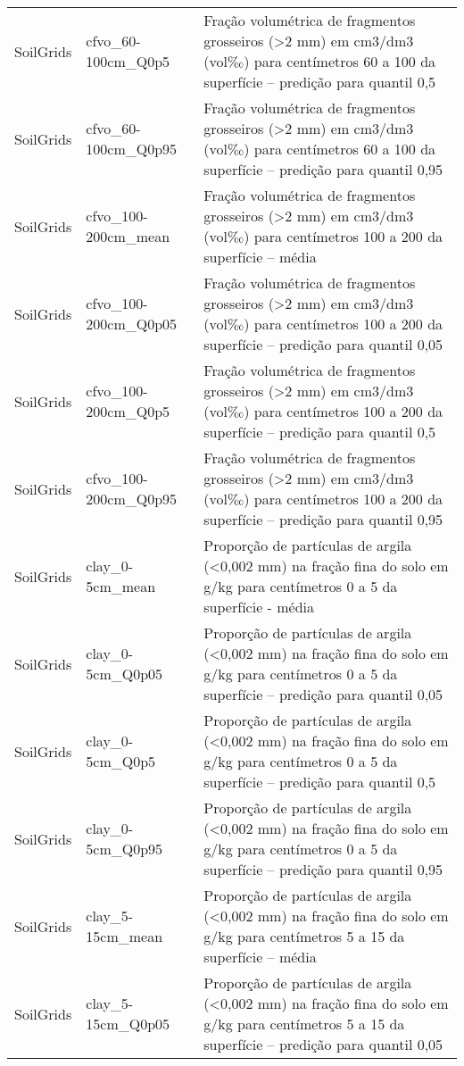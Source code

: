 \begin{longtable}{@{} p{4cm} p{4cm} p{8cm} @{}}
	SoilGrids &
	cfvo\_60-100cm\_Q0p5 &
	Fração volumétrica de fragmentos grosseiros (\textgreater 2 mm) em cm3/dm3 (vol‰) para centímetros 60 a 100 da superfície – predição para quantil 0,5 \\
	SoilGrids &
	cfvo\_60-100cm\_Q0p95 &
	Fração volumétrica de fragmentos grosseiros (\textgreater 2 mm) em cm3/dm3 (vol‰) para centímetros 60 a 100 da superfície – predição para quantil 0,95 \\
	SoilGrids &
	cfvo\_100-200cm\_mean &
	Fração volumétrica de fragmentos grosseiros (\textgreater 2 mm) em cm3/dm3 (vol‰) para centímetros 100 a 200 da superfície – média \\
	SoilGrids &
	cfvo\_100-200cm\_Q0p05 &
	Fração volumétrica de fragmentos grosseiros (\textgreater 2 mm) em cm3/dm3 (vol‰) para centímetros 100 a 200 da superfície – predição para quantil 0,05 \\
	SoilGrids &
	cfvo\_100-200cm\_Q0p5 &
	Fração volumétrica de fragmentos grosseiros (\textgreater 2 mm) em cm3/dm3 (vol‰) para centímetros 100 a 200 da superfície – predição para quantil 0,5 \\
	SoilGrids &
	cfvo\_100-200cm\_Q0p95 &
	Fração volumétrica de fragmentos grosseiros (\textgreater 2 mm) em cm3/dm3 (vol‰) para centímetros 100 a 200 da superfície – predição para quantil 0,95 \\
	SoilGrids &
	clay\_0-5cm\_mean &
	Proporção de partículas de argila (\textless 0,002 mm) na fração fina do solo em g/kg para centímetros 0 a 5 da superfície - média \\
	SoilGrids &
	clay\_0-5cm\_Q0p05 &
	Proporção de partículas de argila (\textless 0,002 mm) na fração fina do solo em g/kg para centímetros 0 a 5 da superfície – predição para quantil 0,05 \\
	SoilGrids &
	clay\_0-5cm\_Q0p5 &
	Proporção de partículas de argila (\textless 0,002 mm) na fração fina do solo em g/kg para centímetros 0 a 5 da superfície – predição para quantil 0,5 \\
	SoilGrids &
	clay\_0-5cm\_Q0p95 &
	Proporção de partículas de argila (\textless 0,002 mm) na fração fina do solo em g/kg para centímetros 0 a 5 da superfície – predição para quantil 0,95 \\
	SoilGrids &
	clay\_5-15cm\_mean &
	Proporção de partículas de argila (\textless 0,002 mm) na fração fina do solo em g/kg para centímetros 5 a 15 da superfície – média \\
	SoilGrids &
	clay\_5-15cm\_Q0p05 &
	Proporção de partículas de argila (\textless 0,002 mm) na fração fina do solo em g/kg para centímetros 5 a 15 da superfície – predição para quantil 0,05 \\

\end{longtable}
